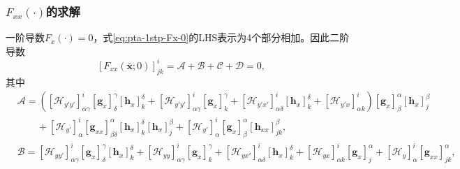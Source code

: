 \subsubsection{$F_{xx}(\cdot)$的求解}
一阶导数$F_{x}(\cdot)=0$，式\eqref{eq:pta-1stp-Fx-0}的LHS表示为4个部分相加。因此二阶导数
\begin{equation}
  \label{eq:pta-F-zero-case-xx}
    \left[F_{xx}(\bar{\bm{x}};0)\right]^{i}_{jk} = \mathcal{A} + \mathcal{B} + \mathcal{C} + \mathcal{D} = 0,
\end{equation}
其中
  \begin{equation*}
    \begin{split}
      &\mathcal{A} =
      \left(
      \left[\mathcal{H}_{y'y'}\right]^{i}_{\alpha \gamma}
      \left[\bm{g}_{x}\right]^{\gamma}_{\delta}
      \left[\bm{h}_{x}\right]^{\delta}_{k}
      + \left[\mathcal{H}_{y'y'}\right]^{i}_{\alpha \gamma}
      \left[\bm{g}_{x}\right]^{\gamma}_{k}
      + \left[\mathcal{H}_{y'x'}\right]^{i}_{\alpha \delta}
      \left[ \bm{h}_{x} \right]^{\delta}_{k}
      + \left[\mathcal{H}_{y'x}\right]^{i}_{\alpha k}
      \right)
      \left[ \bm{g}_{x} \right]^{\alpha}_{\beta}
      \left[ \bm{h}_{x} \right]^{\beta}_{j}\\
      &\qquad +
      \left[ \mathcal{H}_{y'} \right]^{i}_{\alpha}
      \left[ \bm{g}_{xx} \right]^{\alpha}_{\beta \delta}
      \left[ \bm{h}_{x} \right]^{\delta}_{k}
      \left[ \bm{h}_{x} \right]^{\beta}_{j}
      + \left[ \mathcal{H}_{y'} \right]^{i}_{\alpha}
      \left[ \bm{g}_{x} \right]^{\alpha}_{\beta}
      \left[ \bm{h}_{xx} \right]^{\beta}_{j k},\\
&  \mathcal{B} =
  \left[\mathcal{H}_{yy'}\right]^{i}_{\alpha \gamma}
  \left[\bm{g}_{x}\right]^{\gamma}_{\delta}
  \left[\bm{h}_{x}\right]^{\delta}_{k}
  + \left[\mathcal{H}_{yy}\right]^{i}_{\alpha \gamma}
  \left[\bm{g}_{x}\right]^{\gamma}_{k}
  + \left[\mathcal{H}_{yx'}\right]^{i}_{\alpha \delta}
  \left[\bm{h}_{x}\right]^{\delta}_{k}
  + \left[\mathcal{H}_{yx}\right]^{i}_{\alpha k}
  \left[\bm{g}_{x}\right]^{\alpha}_{j}
  + \left[\mathcal{H}_{y}\right]^{i}_{\alpha}
  \left[\bm{g}_{xx}\right]^{\alpha}_{jk}, \\

\end{split}
\end{equation*}
